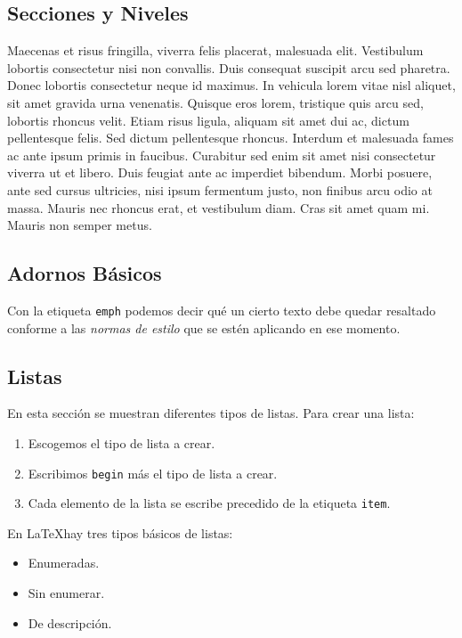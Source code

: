 \documentclass{article}
\begin{document}
\subsection{Secciones y Niveles}
\label{subsec:secciones}

Maecenas et risus fringilla, viverra felis placerat, malesuada elit. Vestibulum lobortis consectetur nisi non convallis. Duis consequat suscipit arcu sed pharetra. Donec lobortis consectetur neque id maximus. In vehicula lorem vitae nisl aliquet, sit amet gravida urna venenatis. Quisque eros lorem, tristique quis arcu sed, lobortis rhoncus velit. Etiam risus ligula, aliquam sit amet dui ac, dictum pellentesque felis. Sed dictum pellentesque rhoncus. Interdum et malesuada fames ac ante ipsum primis in faucibus. Curabitur sed enim sit amet nisi consectetur viverra ut et libero. Duis feugiat ante ac imperdiet bibendum. Morbi posuere, ante sed cursus ultricies, nisi ipsum fermentum justo, non finibus arcu odio at massa. Mauris nec rhoncus erat, et vestibulum diam. Cras sit amet quam mi. Mauris non semper metus. 

\subsection{Adornos Básicos}

Con la etiqueta \texttt{emph} podemos decir qué un cierto texto debe quedar resaltado conforme a las \emph{normas de estilo} que se estén aplicando en ese momento.

\subsection{Listas}

En esta sección se muestran diferentes tipos de listas. Para crear una lista:

\begin{enumerate}
	\item Escogemos el tipo de lista a crear.
	\item Escribimos \texttt{begin} más el tipo de lista a crear. 
	\item Cada elemento de la lista se escribe precedido de la etiqueta \texttt{item}.
\end{enumerate}

En \LaTeX hay tres tipos básicos de listas: 

\begin{itemize}
	\item Enumeradas.
	\item Sin enumerar. 
	\item De descripción.
\end{itemize}
\end{document}
